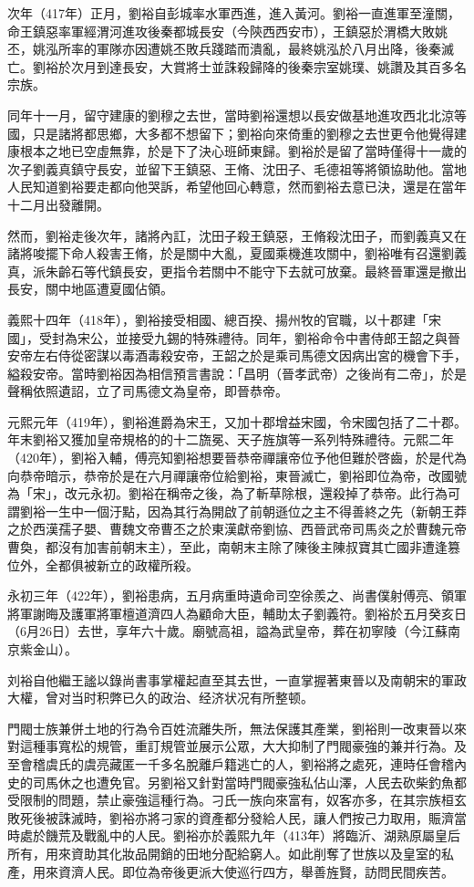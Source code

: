 次年（417年）正月，劉裕自彭城率水軍西進，進入黃河。劉裕一直進軍至潼關，命王鎮惡率軍經渭河進攻後秦都城長安（今陝西西安市），王鎮惡於渭橋大敗姚丕，姚泓所率的軍隊亦因遭姚丕敗兵踐踏而潰亂，最終姚泓於八月出降，後秦滅亡。劉裕於次月到達長安，大賞將士並誅殺歸降的後秦宗室姚璞、姚讚及其百多名宗族。

同年十一月，留守建康的劉穆之去世，當時劉裕還想以長安做基地進攻西北北涼等國，只是諸將都思鄉，大多都不想留下；劉裕向來倚重的劉穆之去世更令他覺得建康根本之地已空虛無靠，於是下了決心班師東歸。劉裕於是留了當時僅得十一歲的次子劉義真鎮守長安，並留下王鎮惡、王脩、沈田子、毛德祖等將領協助他。當地人民知道劉裕要走都向他哭訴，希望他回心轉意，然而劉裕去意已決，還是在當年十二月出發離開。

然而，劉裕走後次年，諸將內訌，沈田子殺王鎮惡，王脩殺沈田子，而劉義真又在諸將唆擺下命人殺害王脩，於是關中大亂，夏國乘機進攻關中，劉裕唯有召還劉義真，派朱齡石等代鎮長安，更指令若關中不能守下去就可放棄。最終晉軍還是撤出長安，關中地區遭夏國佔領。

義熙十四年（418年），劉裕接受相國、總百揆、揚州牧的官職，以十郡建「宋國」，受封為宋公，並接受九錫的特殊禮待。同年，劉裕命令中書侍郎王韶之與晉安帝左右侍從密謀以毒酒毒殺安帝，王韶之於是乘司馬德文因病出宮的機會下手，縊殺安帝。當時劉裕因為相信預言書說：「昌明（晉孝武帝）之後尚有二帝」，於是聲稱依照遺詔，立了司馬德文為皇帝，即晉恭帝。

元熙元年（419年），劉裕進爵為宋王，又加十郡增益宋國，令宋國包括了二十郡。年末劉裕又獲加皇帝規格的的十二旒冕、天子旌旗等一系列特殊禮待。元熙二年（420年），劉裕入輔，傅亮知劉裕想要晉恭帝禪讓帝位予他但難於啓齒，於是代為向恭帝暗示，恭帝於是在六月禪讓帝位給劉裕，東晉滅亡，劉裕即位為帝，改國號為「宋」，改元永初。劉裕在稱帝之後，為了斬草除根，還殺掉了恭帝。此行為可謂劉裕一生中一個汙點，因為其行為開啟了前朝遜位之主不得善終之先（新朝王莽之於西漢孺子嬰、曹魏文帝曹丕之於東漢獻帝劉協、西晉武帝司馬炎之於曹魏元帝曹奐，都沒有加害前朝末主），至此，南朝末主除了陳後主陳叔寶其亡國非遭逢篡位外，全都俱被新立的政權所殺。

永初三年（422年），劉裕患病，五月病重時遺命司空徐羨之、尚書僕射傅亮、領軍將軍謝晦及護軍將軍檀道濟四人為顧命大臣，輔助太子劉義符。劉裕於五月癸亥日（6月26日）去世，享年六十歲。廟號高祖，謚為武皇帝，葬在初寧陵（今江蘇南京紫金山）。

刘裕自他繼王謐以錄尚書事掌權起直至其去世，一直掌握著東晉以及南朝宋的軍政大權，曾对当时积弊已久的政治、经济状况有所整顿。

門閥士族兼併土地的行為令百姓流離失所，無法保護其產業，劉裕則一改東晉以來對這種事寬松的規管，重訂規管並展示公眾，大大抑制了門閥豪強的兼并行為。及至會稽虞氏的虞亮藏匿一千多名脫離戶籍逃亡的人，劉裕將之處死，連時任會稽內史的司馬休之也遭免官。另劉裕又針對當時門閥豪強私佔山澤，人民去砍柴釣魚都受限制的問題，禁止豪強這種行為。刁氏一族向來富有，奴客亦多，在其宗族桓玄敗死後被誅滅時，劉裕亦將刁家的資產都分發給人民，讓人們按己力取用，賑濟當時處於饑荒及戰亂中的人民。劉裕亦於義熙九年（413年）將臨沂、湖熟原屬皇后所有，用來資助其化妝品開銷的田地分配給窮人。如此削奪了世族以及皇室的私產，用來資濟人民。即位為帝後更派大使巡行四方，舉善旌賢，訪問民間疾苦。

